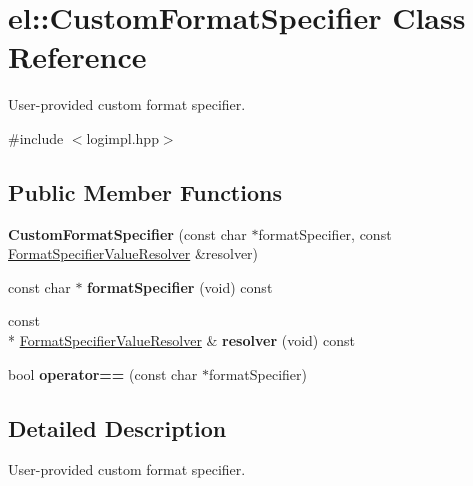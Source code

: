 \hypertarget{classel_1_1CustomFormatSpecifier}{\section{el\-:\-:Custom\-Format\-Specifier Class Reference}
\label{classel_1_1CustomFormatSpecifier}
}


User-\/provided custom format specifier.  




{\ttfamily \#include $<$logimpl.\-hpp$>$}

\subsection*{Public Member Functions}
\begin{DoxyCompactItemize}
\item 
\hypertarget{classel_1_1CustomFormatSpecifier_a1d1bfa8b489d2908ee543023a51e58f6}{{\bfseries Custom\-Format\-Specifier} (const char $\ast$format\-Specifier, const \hyperlink{namespaceel_a4d34c3ab99de9d5d2e531884d50bda3b}{Format\-Specifier\-Value\-Resolver} \&resolver)}\label{classel_1_1CustomFormatSpecifier_a1d1bfa8b489d2908ee543023a51e58f6}

\item 
\hypertarget{classel_1_1CustomFormatSpecifier_a0be00787b7ca1caedd32e1627d76fd24}{const char $\ast$ {\bfseries format\-Specifier} (void) const }\label{classel_1_1CustomFormatSpecifier_a0be00787b7ca1caedd32e1627d76fd24}

\item 
\hypertarget{classel_1_1CustomFormatSpecifier_ac426e6771ae35e060313b8683b88adc8}{const \\*
\hyperlink{namespaceel_a4d34c3ab99de9d5d2e531884d50bda3b}{Format\-Specifier\-Value\-Resolver} \& {\bfseries resolver} (void) const }\label{classel_1_1CustomFormatSpecifier_ac426e6771ae35e060313b8683b88adc8}

\item 
\hypertarget{classel_1_1CustomFormatSpecifier_ae17a9fbf8c5a28867308fcb8966a3aa0}{bool {\bfseries operator==} (const char $\ast$format\-Specifier)}\label{classel_1_1CustomFormatSpecifier_ae17a9fbf8c5a28867308fcb8966a3aa0}

\end{DoxyCompactItemize}


\subsection{Detailed Description}
User-\/provided custom format specifier. 

